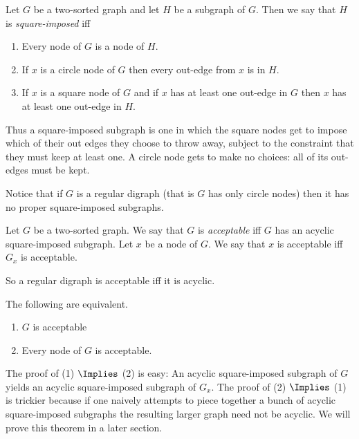 \documentclass[oneside,12pt]{amsart}
\begin{document}
\begin{definition}
Let $G$ be a two-sorted graph and let $H$ be a subgraph of $G$. Then we say that
$H$ is \emph{square-imposed} iff
\begin{enumerate}
\item Every node of $G$ is a node of $H$.
\item If $x$ is a circle node of $G$ then every out-edge from $x$ is in $H$.
\item If $x$ is a square node of $G$ and if $x$ has at least one out-edge
in $G$ then $x$ has at least one out-edge in $H$.
\end{enumerate}

Thus a square-imposed subgraph is one in which the square nodes get to impose
which of their out edges they choose to throw away, subject to the constraint that
they must keep at least one. A circle node gets to make
no choices: all of its out-edges must be kept.

Notice that if $G$ is a regular digraph (that is $G$ has only circle nodes) then it
has no proper square-imposed subgraphs.

\begin{definition}
Let $G$ be a two-sorted graph. We say that $G$ is \emph{acceptable} iff $G$ has
an acyclic square-imposed subgraph. Let $x$ be a node of $G$. We say that $x$ is
acceptable iff $G_x$ is acceptable.
\end{definition}

So a regular digraph is acceptable iff it is acyclic.

\begin{theorem}
\label{Acceptability-Is-Local}
The following are equivalent.
\begin{enumerate}
\item $G$ is acceptable
\item Every node of $G$ is acceptable.
\end{enumerate}
\end{theorem}

The proof of (1) $\Implies$ (2) is easy:  An acyclic square-imposed subgraph of $G$
yields an acyclic square-imposed subgraph of $G_x$. The proof of (2) $\Implies$ (1)
is trickier because if one naively attempts to piece together a bunch of acyclic square-imposed
subgraphs the resulting larger graph need not be acyclic. We will prove this theorem in a later section.

\end{definition}

\end{document}
